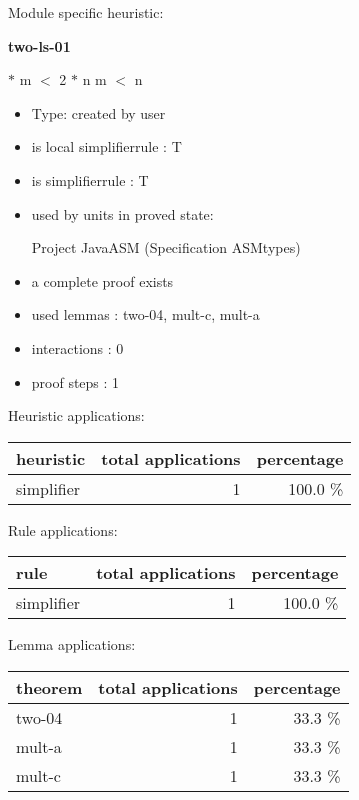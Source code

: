 \documentclass[a4paper]{article}
\begin{document}
Module specific heuristic:

\pagebreak

{\LARGE\bf two-ls-01}\label{lemma-two-ls-01}

\medskip

  $*$ m $<$ 2 $*$ n \Equiv m $<$ n

\begin{itemize}

\item Type: created by user

\item is local simplifierrule : T
\item is simplifierrule : T
\item used by units in proved state:

Project JavaASM (Specification ASMtypes)
\item       a complete proof exists
\item       used lemmas  : two-04, mult-c, mult-a
\item       interactions : 0
\item       proof steps  : 1
\end{itemize}

\medskip


Heuristic applications:

\begin{supertabular}{l|r|r}
heuristic	& total applications & percentage \\ \hline
simplifier & 1 & 100.0 \% \\

\end{supertabular}

Rule applications:

\begin{supertabular}{l|r|r}
rule	        & total applications & percentage \\ \hline
simplifier & 1 & 100.0 \% \\

\end{supertabular}

Lemma applications:

\begin{supertabular}{l|r|r}
theorem	        & total applications & percentage \\ \hline
two-04 & 1 & 33.3 \% \\
mult-a & 1 & 33.3 \% \\
mult-c & 1 & 33.3 \% \\

\end{supertabular}
\end{document}
